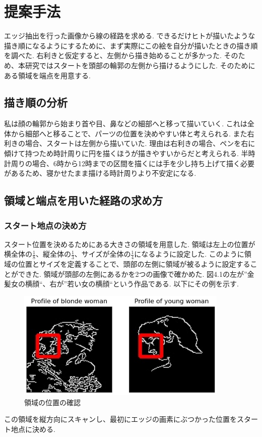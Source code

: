 \chapter{提案手法}
  \label{sec:method}
  エッジ抽出を行った画像から線の経路を求める. できるだけヒトが描いたような描き順になるようにするために、まず実際にこの絵を自分が描いたときの描き順を調べた. 右利きと仮定すると、左側から描き始めることが多かった. そのため、本研究ではスタートを頭部の輪郭の左側から描けるようにした. そのためにある領域を端点を用意する.
  \section{描き順の分析}
  \label{sec:analysis }
  私は顔の輪郭から始まり首や目、鼻などの細部へと移って描いていく. これは全体から細部へと移ることで、パーツの位置を決めやすい体と考えられる. また右利きの場合、スタートは左側から描いていた. 理由は右利きの場合、ペンを右に傾けて持つため時計周りに円を描くほうが描きやすいからだと考えられる. 半時計周りの場合、6時から12時までの区間を描くには手を少し持ち上げて描く必要があるため、寝かせたまま描ける時計周りより不安定になる.
	\section{領域と端点を用いた経路の求め方}
    \label{sec:the way of the route}
	\subsection{スタート地点の決め方}
	\label{sec:how to define the start point}
	スタート位置を決めるためにある大きさの領域を用意した. 領域は左上の位置が横全体の$\frac{1}{8}$、縦全体の$\frac{1}{3}$、サイズが全体の$\frac{1}{4}$になるように設定した. このように領域の位置とサイズを定義することで、頭部の左側に領域が被るように設定することができた. 領域が頭部の左側にあるかを2つの画像で確かめた. 図4.1の左が''金髪女の横顔``、右が''若い女の横顔``という作品である. 以下にその例を示す. 
	  \begin{center}
        \begin{figure}[h]
            \includegraphics[width=0.90\textwidth]{./img/003.png}
            \caption{領域の位置の確認}
            \label{the position of a region}
        \end{figure}
    \end{center}
	この領域を縦方向にスキャンし、最初にエッジの画素にぶつかった位置をスタート地点に決める.
